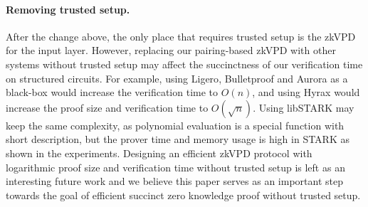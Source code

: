 \paragraph{Removing trusted setup.} After the change above, the only place that requires trusted setup is the zkVPD for the input layer. However, replacing our pairing-based zkVPD with other systems without trusted setup may affect the succinctness of our verification time on structured circuits. For example, using \textsf{Ligero}, \textsf{Bulletproof} and \textsf{Aurora} as a black-box would increase the verification time to $O(n)$, and using \textsf{Hyrax} would increase the proof size and verification time to $O(\sqrt{n})$. Using \textsf{libSTARK} may keep the same complexity, as polynomial evaluation is a special function with short description, but the prover time and memory usage is high in STARK as shown in the experiments. Designing an efficient zkVPD protocol with logarithmic proof size and verification time without trusted setup is left as an interesting future work and we believe this paper serves as an important step towards the goal of efficient succinct zero knowledge proof without trusted setup. 